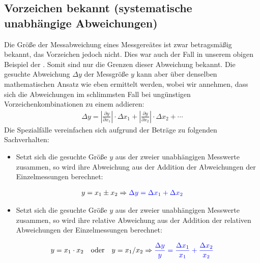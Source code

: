 \documentclass[letterpaper,10pt,english]{jupyterBook}
\begin{document}
\subsection{Vorzeichen bekannt (systematische unabhängige Abweichungen) }
\label{\detokenize{content/1_Fehlerfortpflanzung:vorzeichen-unbekannt-systematische-unabhangige-abweichungen-a-id-subsec-fehlergrenzen-a}}
\sphinxAtStartPar
Die Größe der Messabweichung eines Messgereätes ist zwar betragsmäßig bekannt, das Vorzeichen jedoch nicht. Dies war auch der Fall in unserem obigen Beispiel der . Somit sind nur die Grenzen dieser Abweichung bekannt. Die gesuchte Abweichung \(\Delta y\) der Messgröße \(y\) kann aber über denselben mathematischen Ansatz wie eben ermittelt werden, wobei wir annehmen, dass sich die Abweichungen im schlimmsten Fall bei ungünstigen Vorzeichenkombinationen zu einem  addieren:
\begin{equation*}
\begin{split}\Delta y = \left| \frac{\partial y}{\partial x_1} \right| \cdot \Delta x_1+ \left|\frac{\partial y}{\partial x_2} \right| \cdot \Delta x_2 + \cdots\end{split}
\end{equation*}
\sphinxAtStartPar
Die Spezialfälle vereinfachen sich aufgrund der Beträge zu folgenden Sachverhalten:
\begin{itemize}
\item {} 
\sphinxAtStartPar
Setzt sich die gesuchte Größe \(y\) aus der  zweier unabhängigen Messwerte zusammen, so wird ihre Abweichung aus der Addition der Abweichungen der Einzelmessungen berechnet:

\end{itemize}
\begin{equation*}
\begin{split}y=x_1 \pm x_2 \Rightarrow  \color{blue}{
   \Delta y =  \Delta x_1 + \Delta x_2 } \end{split}
\end{equation*}\begin{itemize}
\item {} 
\sphinxAtStartPar
Setzt sich die gesuchte Größe \(y\) aus der  zweier unabhängigen Messwerte zusammen, so wird ihre relative Abweichung aus der Addition der relativen Abweichungen der Einzelmessungen berechnet:

\end{itemize}
\begin{equation*}
\begin{split}y=x_1 \cdot x_2 \quad \textrm{oder} \quad y=x_1 / x_2 \Rightarrow  \color{blue}{
   \frac{\Delta y}{y} =  \frac{\Delta x_1}{x_1} + \frac{\Delta x_2}{x_2} }\end{split}
\end{equation*}
\end{document}

